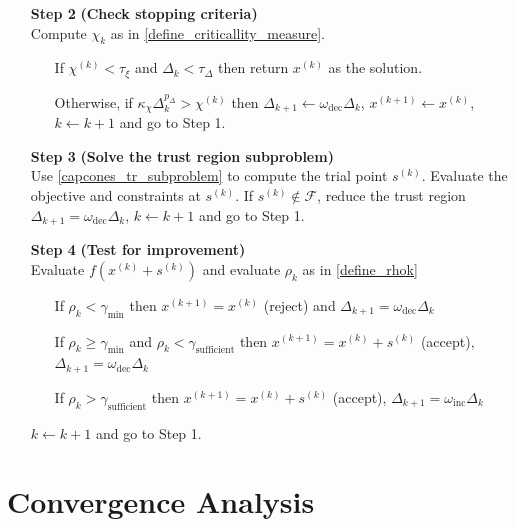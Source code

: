 \documentclass{article}
\theoremstyle{case}
\newcommand{\chik}{{\chi^{(k)}}}
\newcommand{\dk}{\Delta_k}
\newcommand{\feasible}{{\mathcal F}}
\newcommand{\gammabi}{\gamma_{\text{sufficient}}}
\newcommand{\gammasm}{\gamma_{\text{min}}}
\newcommand{\mfk}{{{m}_f}^{(k)}}
\newcommand{\omegadec}{\omega_{\text{dec}}}
\newcommand{\omegainc}{\omega_{\text{inc}}}
\newcommand{\rk}{\rho_k}
\newcommand{\sk}{{{s}^{(k)}}}
\newcommand{\xkpo}{{{x}^{(k+1)}}}
\newcommand{\xk}{{x^{(k)}}}
\begin{document}
\begin{algorithm}[H]
\begin{itemize}
        \item[\textbf{Step 2}] \textbf{(Check stopping criteria)} \\
            Compute $\chi_k$ as in \cref{define_criticallity_measure}. \begin{itemize}
                \item[] If $ \chik < \tau_{\xi} $ and $\dk <\tau_{\Delta}$ then return $\xk$ as the solution.
                \item[] Otherwise, if $\kappa_{\chi} \dk^{p_{\Delta}} > \chik$ then 
                $\Delta_{k+1} \gets \omegadec\dk$, 
                $x^{(k+1)} \gets \xk$,
                $k \gets k+1$ and go to Step 1.
            \end{itemize}
        
        \item[\textbf{Step 3}] \textbf{(Solve the trust region subproblem)} \\
        	Use \cref{capcones_tr_subproblem} to compute the trial point $\sk$.
        	Evaluate the objective and constraints at $\sk$.
        	If $\sk \not \in \feasible$, reduce the trust region $\Delta_{k+1} = \omegadec\dk$, $k \gets k+1$ and go to Step 1.
            
        \item[\textbf{Step 4}] \textbf{(Test for improvement)} \\
            Evaluate $f(\xk + \sk)$ and evaluate $\rk$ as in \cref{define_rhok} \begin{itemize}
                \item[] If $\rk < \gammasm$ then $\xkpo=\xk$ (reject) and $\Delta_{k+1} = \omegadec\dk$
                \item[] If $\rk \ge \gammasm$ and $\rk < \gammabi$ then $\xkpo=\xk+\sk$ (accept), $\Delta_{k+1} = \omegadec\dk$
                \item[] If $\rk > \gammabi$ then $\xkpo=\xk+\sk$ (accept), $\Delta_{k+1} = \omegainc\dk$
            \end{itemize}
            $k \gets k+1$ and go to Step 1.
    \end{itemize}
\end{algorithm}

\section{Convergence Analysis}
\end{document}
